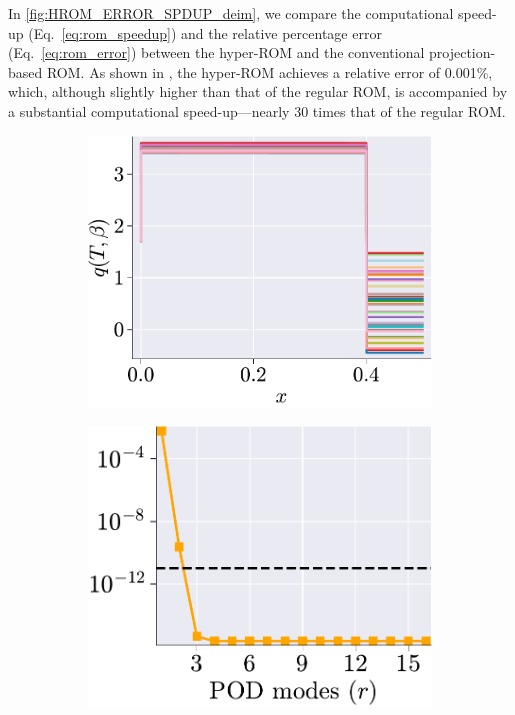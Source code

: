 \documentclass[11pt]{article}
\begin{document}
In \cref{fig:HROM_ERROR_SPDUP_deim}, we compare the computational speed-up (Eq.~\ref{eq:rom_speedup}) and the relative percentage error (Eq.~\ref{eq:rom_error}) between the hyper-ROM and the conventional projection-based ROM.
As shown in , the hyper-ROM achieves a relative error of 0.001\%, which, although slightly higher than that of the regular ROM, is accompanied by a substantial computational speed-up—nearly 30 times that of the regular ROM.


\begin{figure}[t]
\centering
\begin{subfigure}[b]{0.45\linewidth}
\centering
\includegraphics[width=\linewidth]{DEIM_snapshots.pdf}
\caption{}
\label{fig:DEIM_snap_a}
\end{subfigure}
\begin{subfigure}[b]{0.45\linewidth}
\centering
\includegraphics[width=0.97\linewidth]{DEIM_SVs.pdf}

\end{subfigure}
\end{figure}
\end{document}
